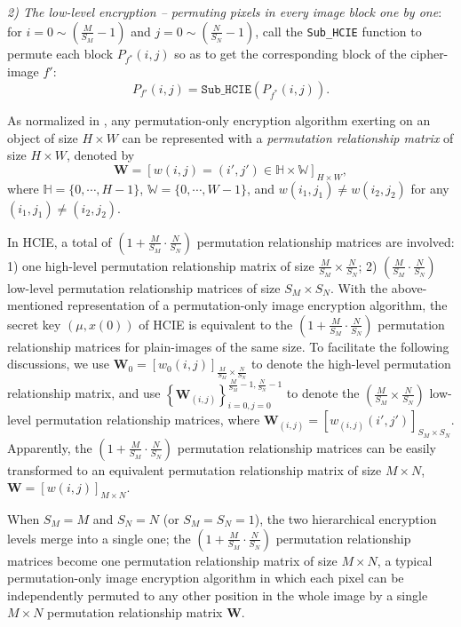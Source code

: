 \documentclass[final,3p,times,twocolumn]{elsarticle}
\begin{document}
\begin{itemize}
\textit{2) The low-level encryption -- permuting pixels in every
image block one by one}: for $i=0\sim\left(\frac{M}{S_M}-1\right)$ and
$j=0\sim\left(\frac{N}{S_N}-1\right)$, call the \texttt{Sub\_HCIE}
function to permute each block $P_{f^*}(i,j)$ so as to get the
corresponding block of the cipher-image $f'$:
\[P_{f'}(i,j)=\mathtt{Sub\_HCIE}\left(P_{f^*}(i,j)\right).
\]
\end{itemize}

As normalized in \cite{Li:Permutation:SPIC2008}, any permutation-only encryption algorithm exerting on
an object of size $H\times W$ can be represented with a \textit{permutation relationship matrix} of size
$H\times W$, denoted by
\begin{equation}
\bm{W}=\left[w(i,j)=(i',j')\in\mathbb{H}\times\mathbb{W}\right]_{H\times W},
\label{eq:PermutationRelation}
\end{equation}
where $\mathbb{H}=\{0,\cdots, H-1\}$,
$\mathbb{W}=\{0,\cdots, W-1\}$, and
$w(i_1,j_1)\neq w(i_2,j_2)$ for any $(i_1,j_1)\neq(i_2,j_2)$.

In HCIE, a total of
$\left(1+\frac{M}{S_M}\cdot\frac{N}{S_N}\right)$ permutation relationship
matrices are involved: 1) one high-level permutation relationship matrix of
size $\frac{M}{S_M}\times\frac{N}{S_N}$; 2)
$\left(\frac{M}{S_M}\cdot\frac{N}{S_N}\right)$ low-level
permutation relationship matrices of size $S_M\times S_N$. With the
above-mentioned representation of a permutation-only image encryption algorithm,
the secret key $(\mu,x(0))$ of HCIE is equivalent to the
$\left(1+\frac{M}{S_M}\cdot\frac{N}{S_N}\right)$ permutation relationship matrices
for plain-images of the same size. To facilitate the following discussions, we use
$\bm{W}_0=[w_0(i,j)]_{\frac{M}{S_M}\times\frac{N}{S_N}}$ to denote
the high-level permutation relationship matrix, and use
$\left\{\bm{W}_{(i,j)}\right\}_{i=0,j=0}^{\frac{M}{S_M}-1,\frac{N}{S_N}-1}$
to denote the $\left(\frac{M}{S_M}\times\frac{N}{S_N}\right)$
low-level permutation relationship matrices, where
$\bm{W}_{(i,j)}=\left[w_{(i,j)}(i',j')\right]_{S_M\times S_N}$.
Apparently, the $\left(1+\frac{M}{S_M}\cdot\frac{N}{S_N}\right)$
permutation relationship matrices can be easily transformed to an equivalent
permutation relationship matrix of size $M\times N$, $\bm{W}=[w(i,j)]_{M\times
N}$.

When $S_M=M$ and $S_N=N$ (or $S_M=S_N=1$), the two hierarchical
encryption levels merge into a single one; the
$\left(1+\frac{M}{S_M}\cdot\frac{N}{S_N}\right)$ permutation relationship matrices become one permutation relationship matrix of size $M\times N$,
a typical permutation-only image encryption algorithm in which each pixel can be independently
permuted to any other position in the whole image by a single
$M\times N$ permutation relationship matrix $\bm{W}$.
\end{document}
